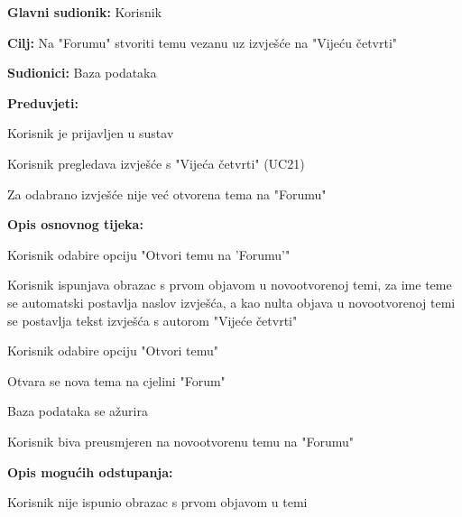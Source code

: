 						
						
					\noindent {}
					\begin{packed_item}
	
						\item \textbf{Glavni sudionik: }Korisnik
						\item  \textbf{Cilj:} Na "Forumu" stvoriti temu vezanu uz izvješće na "Vijeću četvrti"
						\item  \textbf{Sudionici:} Baza podataka
						\item  \textbf{Preduvjeti:}
						\item[] \begin{packed_enum}
							\item Korisnik je prijavljen u sustav
							\item Korisnik pregledava izvješće s "Vijeća četvrti" (UC21)
							\item Za odabrano izvješće nije već otvorena tema na "Forumu"								\end{packed_enum}
						\item  \textbf{Opis osnovnog tijeka:}
						
						\item[] \begin{packed_enum}
	
							\item Korisnik odabire opciju "Otvori temu na 'Forumu'"
							\item Korisnik ispunjava obrazac s prvom objavom u novootvorenoj temi, za ime teme se automatski postavlja naslov izvješća, a kao nulta objava u novootvorenoj temi se postavlja tekst izvješća s autorom "Vijeće četvrti"
							\item Korisnik odabire opciju "Otvori temu"
							\item Otvara se nova tema na cjelini "Forum"
							\item Baza podataka se ažurira
							\item Korisnik biva preusmjeren na novootvorenu temu na "Forumu"
							
						\end{packed_enum}	
						
						\item  \textbf{Opis mogućih odstupanja:}
						
						\item[] \begin{packed_item}
						\item[3.a] Korisnik nije ispunio obrazac s prvom objavom u temi
							\item[] \begin{packed_enum}
								

\end{packed_enum}
\end{packed_item}
\end{packed_item}
